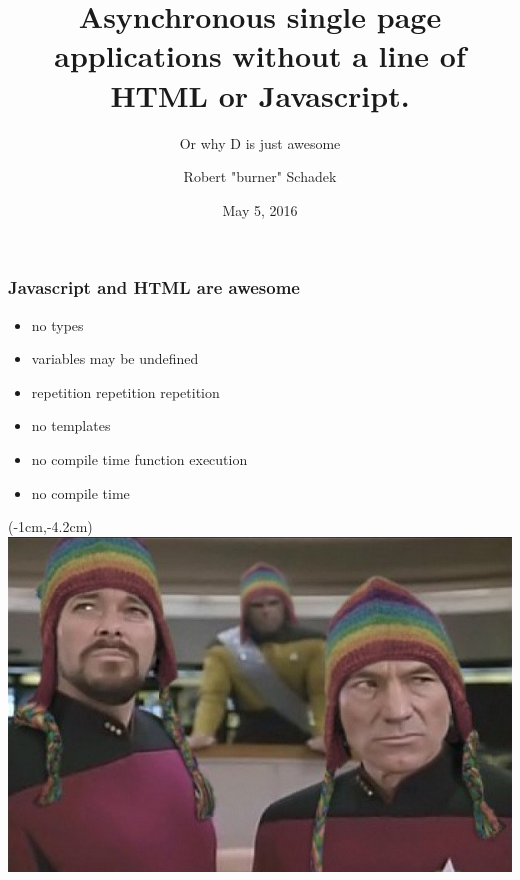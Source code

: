 \documentclass[notes,xelatex,13pt]{beamer}
\title{Asynchronous single page applications without a line of HTML or
Javascript.}
\subtitle{Or why D is just awesome}
\author{Robert "burner" Schadek}
\date{May 5, 2016}
\institute{DConf}
\begin{document}
\maketitle

\begin{frame}
	\frametitle{Javascript and HTML are \textbf{awesome}}
	\begin{itemize}
		\item no types
		\item variables may be undefined
		\item repetition repetition repetition
		\item no templates
		\item no compile time function execution
			\pause
		\item no compile time
	\end{itemize}
\end{frame}


\begin{frame}[plain]
\begin{textblock*}{0cm}(-1cm,-4.2cm)
	\includegraphics[width=1.0\paperwidth]{picardriker.jpg}
\end{textblock*}
\end{frame}
\end{document}
